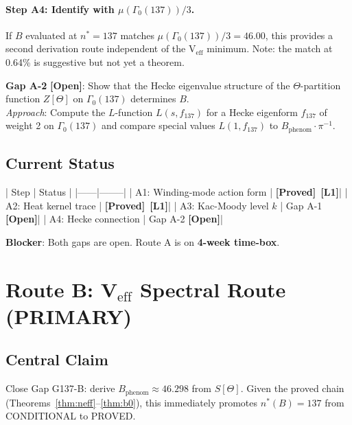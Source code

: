 \documentclass[12pt,a4paper]{article}
\theoremstyle{definition}
\theoremstyle{remark}
\newcommand{\PROVED}{\textbf{[Proved]}}
\newcommand{\OPEN}{\textbf{[Open]}}
\newcommand{\Lone}{\textbf{[L1]}}
\begin{document}
\paragraph{Step A4: Identify with $\mu(\Gamma_0(137))/3$.}
If $B$ evaluated at $n^* = 137$ matches $\mu(\Gamma_0(137))/3 = 46.00$,
this provides a second derivation route independent of the V$_{\mathrm{eff}}$
minimum.
Note: the match at 0.64\% is suggestive but not yet a theorem.
\begin{mdframed}[backgroundcolor=yellow!15]
\textbf{Gap A-2} \OPEN: Show that the Hecke eigenvalue structure of the
$\Theta$-partition function $Z[\Theta]$ on $\Gamma_0(137)$ determines $B$.\\
\textit{Approach}: Compute the $L$-function $L(s, f_{137})$ for a Hecke
eigenform $f_{137}$ of weight 2 on $\Gamma_0(137)$ and compare special
values $L(1, f_{137})$ to $B_{\mathrm{phenom}} \cdot \pi^{-1}$.
\end{mdframed}

\subsection{Current Status}

| Step | Status |
|------|--------|
| A1: Winding-mode action form | \PROVED\ \Lone |
| A2: Heat kernel trace | \PROVED\ \Lone |
| A3: Kac-Moody level $k$ | Gap A-1 \OPEN |
| A4: Hecke connection | Gap A-2 \OPEN |

\textbf{Blocker}: Both gaps are open. Route A is on \textbf{4-week time-box}.

\section{Route B: V$_{\mathrm{eff}}$ Spectral Route (PRIMARY)}
\label{sec:route_b}

\subsection{Central Claim}

\begin{tcolorbox}[colback=green!4!white,colframe=green!60!black,
  title=Route B Target (PRIMARY ROUTE)]
Close Gap G137-B: derive $B_{\mathrm{phenom}} \approx 46.298$ from $S[\Theta]$.
Given the proved chain (Theorems~\ref{thm:neff}--\ref{thm:b0}),
this immediately promotes $n^*(B) = 137$ from CONDITIONAL to PROVED.
\end{tcolorbox}
\end{document}
